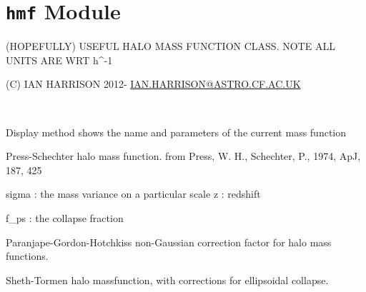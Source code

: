 \documentclass[letterpaper,10pt,english]{sphinxmanual}
\begin{document}
\section{\texttt{hmf} Module}
\label{PyCosmo:hmf-module}\label{PyCosmo:module-PyCosmo.hmf}
(HOPEFULLY) USEFUL HALO MASS FUNCTION CLASS.
NOTE ALL UNITS ARE WRT h\textasciicircum{}-1

(C) IAN HARRISON
2012-
\href{mailto:IAN.HARRISON@ASTRO.CF.AC.UK}{IAN.HARRISON@ASTRO.CF.AC.UK}

\begin{fulllineitems}
\label{PyCosmo:PyCosmo.hmf.Hmf}~

\begin{fulllineitems}
\label{PyCosmo:PyCosmo.hmf.Hmf.display}
Display method shows the name and parameters of the
current mass function

\end{fulllineitems}


\begin{fulllineitems}
\label{PyCosmo:PyCosmo.hmf.Hmf.ps}
Press-Schechter halo mass function.
from Press, W. H., Schechter, P., 1974, ApJ, 187, 425

sigma : the mass variance on a particular scale
z : redshift

f\_ps : the collapse fraction

\end{fulllineitems}


\begin{fulllineitems}
\label{PyCosmo:PyCosmo.hmf.Hmf.r_pgh}
Paranjape-Gordon-Hotchkiss non-Gaussian correction factor for
halo mass functions.

\end{fulllineitems}


\begin{fulllineitems}
\label{PyCosmo:PyCosmo.hmf.Hmf.st}
Sheth-Tormen halo massfunction, with corrections for
ellipsoidal collapse.


\end{fulllineitems}
\end{fulllineitems}
\end{document}
